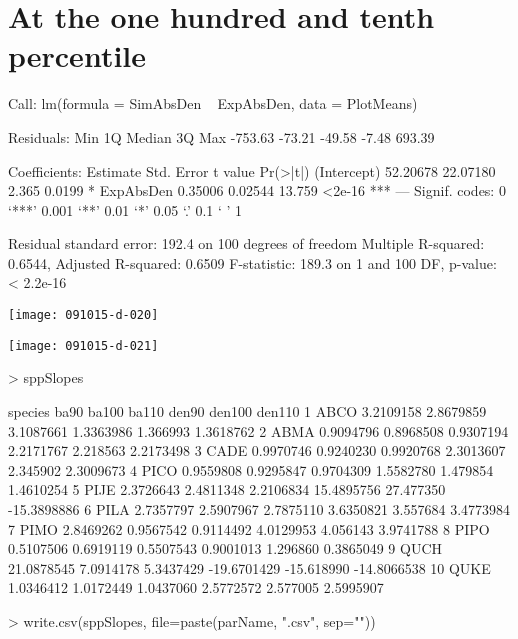 \documentclass{article}
\begin{document}
\section{At the one hundred and tenth percentile}
\begin{Schunk}
\begin{Soutput}
Call:
lm(formula = SimAbsDen ~ ExpAbsDen, data = PlotMeans)

Residuals:
    Min      1Q  Median      3Q     Max 
-753.63  -73.21  -49.58   -7.48  693.39 

Coefficients:
            Estimate Std. Error t value Pr(>|t|)    
(Intercept) 52.20678   22.07180   2.365   0.0199 *  
ExpAbsDen    0.35006    0.02544  13.759   <2e-16 ***
---
Signif. codes:  0 ‘***’ 0.001 ‘**’ 0.01 ‘*’ 0.05 ‘.’ 0.1 ‘ ’ 1

Residual standard error: 192.4 on 100 degrees of freedom
Multiple R-squared:  0.6544,	Adjusted R-squared:  0.6509 
F-statistic: 189.3 on 1 and 100 DF,  p-value: < 2.2e-16
\end{Soutput}
\end{Schunk}
\texttt{[image: 091015-d-020]}

\texttt{[image: 091015-d-021]}
\begin{Schunk}
\begin{Sinput}
>   sppSlopes
\end{Sinput}
\begin{Soutput}
   species       ba90     ba100     ba110       den90     den100      den110
1     ABCO  3.2109158 2.8679859 3.1087661   1.3363986   1.366993   1.3618762
2     ABMA  0.9094796 0.8968508 0.9307194   2.2171767   2.218563   2.2173498
3     CADE  0.9970746 0.9240230 0.9920768   2.3013607   2.345902   2.3009673
4     PICO  0.9559808 0.9295847 0.9704309   1.5582780   1.479854   1.4610254
5     PIJE  2.3726643 2.4811348 2.2106834  15.4895756  27.477350 -15.3898886
6     PILA  2.7357797 2.5907967 2.7875110   3.6350821   3.557684   3.4773984
7     PIMO  2.8469262 0.9567542 0.9114492   4.0129953   4.056143   3.9741788
8     PIPO  0.5107506 0.6919119 0.5507543   0.9001013   1.296860   0.3865049
9     QUCH 21.0878545 7.0914178 5.3437429 -19.6701429 -15.618990 -14.8066538
10    QUKE  1.0346412 1.0172449 1.0437060   2.5772572   2.577005   2.5995907
\end{Soutput}
\begin{Sinput}
>     write.csv(sppSlopes, file=paste(parName, ".csv", sep=""))
\end{Sinput}
\end{Schunk}
\end{document}
